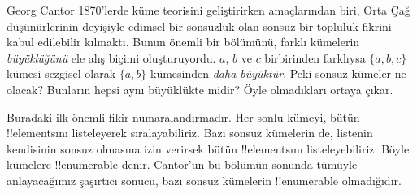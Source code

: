 \documentclass[../../../include/open-logic-section]{subfiles}
\begin{document}


Georg Cantor 1870'lerde küme teorisini geliştirirken amaçlarından biri, Orta
Çağ düşünürlerinin deyişiyle edimsel bir sonsuzluk olan sonsuz bir topluluk
fikrini kabul edilebilir kılmaktı. Bunun önemli bir bölümünü, farklı kümelerin
\emph{büyüklüğünü} ele alış biçimi oluşturuyordu. $a$, $b$ ve $c$ birbirinden
farklıysa $\{a, b, c\}$ kümesi sezgisel olarak $\{a, b\}$ kümesinden
\emph{daha büyüktür}. Peki sonsuz kümeler ne olacak? Bunların hepsi aynı
büyüklükte midir? Öyle olmadıkları ortaya çıkar.

Buradaki ilk önemli fikir numaralandırmadır. Her sonlu kümeyi, bütün
!!{element}s{}ını listeleyerek sıralayabiliriz. Bazı sonsuz kümelerin de,
listenin kendisinin sonsuz olmasına izin verirsek bütün !!{element}s{}ını
listeleyebiliriz. Böyle kümelere !!{enumerable} denir. Cantor'un bu bölümün
sonunda tümüyle anlayacağımız şaşırtıcı sonucu, bazı sonsuz kümelerin
!!{enumerable} olmadığıdır.
\end{document}
